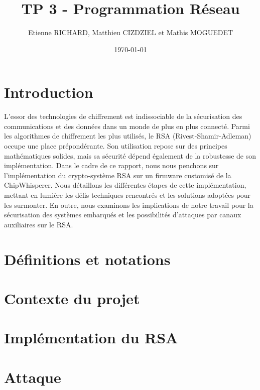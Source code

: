 \documentclass[12pt]{article}
\title{TP 3 - Programmation Réseau}	\let\Title\@title
\author{Etienne RICHARD, Matthieu CIZDZIEL et Mathis MOGUEDET} \let\Author\@author
\date{\today}           	\let\Date\@date
\begin{document}
\maketitle
\pagebreak

\tableofcontents
\pagebreak

\section*{Introduction}
L'essor des technologies de chiffrement est indissociable de la sécurisation des communications et des données dans un monde de plus en plus connecté. Parmi les algorithmes de chiffrement les plus utilisés, le RSA (Rivest-Shamir-Adleman) occupe une place prépondérante. Son utilisation repose sur des principes mathématiques solides, mais sa sécurité dépend également de la robustesse de son implémentation. Dans le cadre de ce rapport, nous nous penchons sur l'implémentation du crypto-système RSA sur un firmware customisé de la ChipWhisperer. Nous détaillons les différentes étapes de cette implémentation, mettant en lumière les défis techniques rencontrés et les solutions adoptées pour les surmonter. En outre, nous examinons les implications de notre travail pour la sécurisation des systèmes embarqués et les possibilités d'attaques par canaux auxiliaires sur le RSA.

\section{Définitions et notations}


\pagebreak
\section{Contexte du projet}


\pagebreak
\section{Implémentation du RSA}


\section{Attaque}

\end{document}
